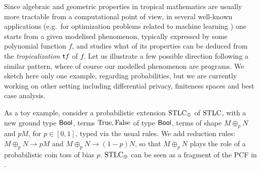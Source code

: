 \documentclass[submission,%
]{eptcs}
\begin{document}
Since algebraic and geometric properties in tropical mathematics are usually more tractable from a computational point of view, in several well-known applications (e.g.~for optimization problems related to machine learning \cite{Pachter2004, Zhang2018, Maragos2021}) one starts from a given modelised phenomenon, typically expressed by some polynomial function $f$, and studies 
what of its properties can be deduced from the \emph{tropicalization} $\mathsf{t} f$ of $f$.
Let us illustrate a few possible direction following a similar pattern, where of course our modelled phenomenon are programs.%
We sketch here only one example, regarding probabilities, but we are currently working on other setting including differential privacy, finiteness spaces and best case analysis.

As a toy example, consider a probabilistic extension $\mathrm{STLC}_\oplus$ of $\mathrm{STLC}$, with a new ground type $\mathsf{Bool}$, terms $\mathrm{True},\mathrm{False}$ of type $\mathsf{Bool}$, terms of shape $M\oplus_p N$ and $pM$, for $p\in[0,1]$, typed via the usual rules.
We add reduction rules:
$M\oplus_p N \to pM$ and $M\oplus_p N \to (1-p)N$,
so that $M\oplus_p N$ plays the role of a probabilistic coin toss of bias $p$.
$\mathrm{STLC}_\oplus$ can be seen as a fragment of the PCF in \cite{Manzo2013}.
\end{document}
